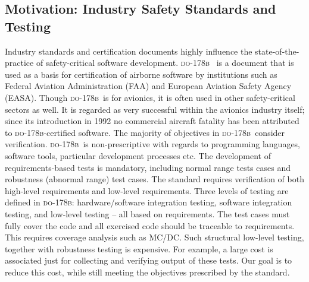 \documentclass[sttt,final]{svjour}
\newcommand{\DOB}{\textsc{do-178b}}
\begin{document}
\subsection{Motivation: Industry Safety Standards and Testing}
Industry standards and certification documents highly influence the
state-of-the-practice of safety-critical software development. \DOB\
\cite{do178b} is a document that is used as a basis for certification
of airborne software by institutions such as Federal Aviation
Administration (FAA) and European Aviation Safety Agency
(EASA). Though \DOB\ is for avionics, it is often used in other
safety-critical sectors as well. It is regarded as very successful
within the avionics industry itself; since its introduction in 1992 no
commercial aircraft fatality has been attributed to \DOB-certified
software. The majority of objectives in \DOB\ consider
verification. \DOB\ is non-prescriptive with regards to programming
languages, software tools, particular development processes etc. The
development of requirements-based tests is mandatory, including normal
range tests cases and robustness (abnormal range) test cases. The
standard requires verification of both high-level requirements and
low-level requirements. Three levels of testing are defined in \DOB:
hardware/software integration testing, software integration testing,
and low-level testing -- all based on requirements. The test cases must
fully cover the code and all exercised code should be traceable to
requirements. This requires coverage analysis such as MC/DC. Such
structural low-level testing, together with robustness testing is
expensive. For example, a large cost is associated just for collecting
and verifying output of these tests. Our goal is to reduce this cost,
while still meeting the objectives prescribed by the standard.
\end{document}
